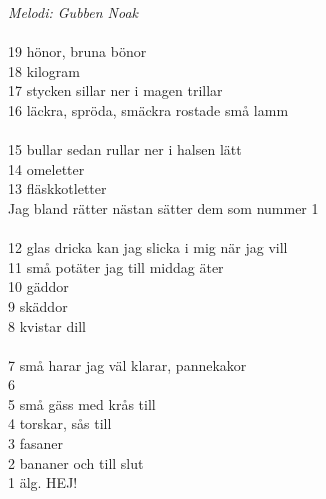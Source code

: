 {\footnotesize\textit{Melodi: Gubben Noak}}\\
\\
19 hönor, bruna bönor\\
18 kilogram\\
17 stycken sillar ner i magen trillar\\
16 läckra, spröda, smäckra rostade små lamm\\
\\
15 bullar sedan rullar ner i halsen lätt\\
14 omeletter\\
13 fläskkotletter\\
Jag bland rätter nästan sätter dem som nummer 1\\
\\
12 glas dricka kan jag slicka i mig när jag vill\\
11 små potäter jag till middag äter\\
10 gäddor\\
9 skäddor\\
8 kvistar dill\\
\\
7 små harar jag väl klarar, pannekakor\\
6\\
5 små gäss med krås till\\
4 torskar, sås till\\
3 fasaner\\
2 bananer och till slut\\
1 älg. HEJ!
